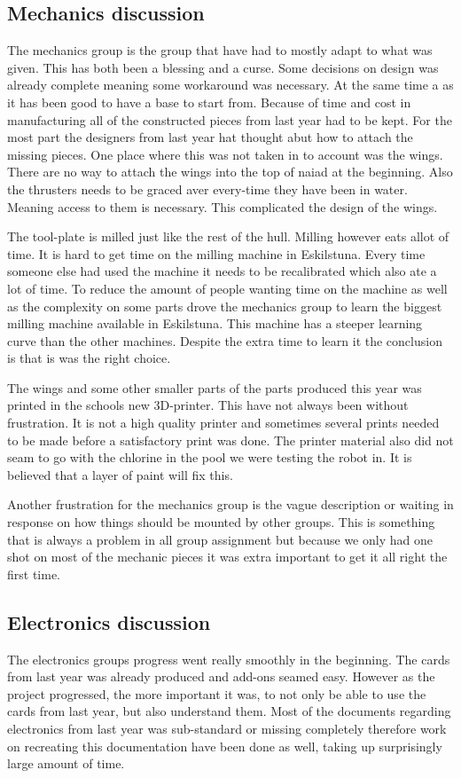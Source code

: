 \subsection{Mechanics discussion}
\noindent
The mechanics group is the group that have had to mostly adapt to what was given. This has both been a blessing and a curse. Some decisions on design was already complete meaning some workaround was necessary. At the same time a as it has been good to have a base to start from. Because of time and cost in manufacturing all of the constructed pieces from last year had to be kept. For the most part the designers from last year hat thought abut how to attach the missing pieces. One place where this was not taken in to account was the wings. There are no way to attach the wings into the top of naiad at the beginning. Also the thrusters needs to be graced aver every-time they have been in water. Meaning access to them is necessary. This complicated the design of the wings.

The tool-plate is milled just like the rest of the hull. Milling however eats allot of time. It is hard to get time on the milling machine in Eskilstuna. Every time someone else had used the machine it needs to be recalibrated which also ate a lot of time. To reduce the amount of people wanting time on the machine as well as the complexity on some parts drove the mechanics group to learn the biggest milling machine available in Eskilstuna. This machine has a steeper learning curve than the other machines. Despite the extra time to learn it the conclusion is that is was the right choice. 

The wings and some other smaller parts of the parts produced this year was printed in the schools new 3D-printer. This have not always been without frustration. It is not a high quality printer and sometimes several prints needed to be made before a satisfactory print was done. The printer material also did not seam to go with the chlorine in the pool we were testing the robot in. It is believed that a layer of paint will fix this. 

Another frustration for the mechanics group is the vague description or waiting in response on how things should be mounted by other groups. This is something that is always a problem in all group assignment but because we only had one shot on most of the mechanic pieces it was extra important to get it all right the first time. 

\subsection{Electronics discussion}
\noindent
The electronics groups progress went really smoothly in the beginning. The cards from last year was already produced and add-ons seamed easy. However as the project progressed, the more important it was, to not only be able to use the cards from last year, but also understand them. Most of the documents regarding electronics from last year was sub-standard or missing completely therefore work on recreating this documentation have been done as well, taking up surprisingly large amount of time.

